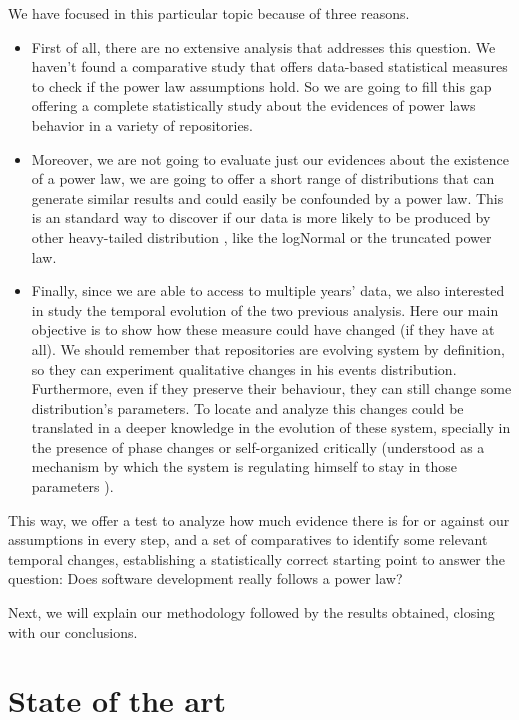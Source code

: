 \documentclass[conference]{IEEEtran}
\begin{document}
We have focused in this particular topic because of three reasons.\begin{itemize} 
\item First of all, there are no 
extensive analysis that addresses this question. We haven't found a comparative study 
that offers data-based statistical measures to check if the power law assumptions hold.
So we are going to fill this gap offering a complete statistically study about
the evidences of power laws behavior in a variety of repositories.
\item Moreover, we are not going to evaluate just our evidences about the existence of a power law,
we are going to offer a short range of distributions that can generate similar results and could
easily be confounded by a power law. This is an standard way to discover if our data is more likely
to be produced by other heavy-tailed distribution \cite{clauset2009power}, like the logNormal
or the truncated power law. 
\item 
Finally, since we are able to access to multiple years' data, we also interested in study the
temporal evolution of the two previous analysis. Here our main objective is to show how these measure could 
have changed (if they have at all). We should remember that repositories are evolving system
by definition, so they can experiment qualitative changes in his events distribution. Furthermore, even 
if they preserve their behaviour, they can still change some distribution's parameters.
To locate and analyze this changes could be translated in a deeper knowledge in the evolution 
of these system, specially in the presence of phase changes \cite{merelo2017self} or self-organized
critically (understood as a mechanism by which the system is regulating himself to stay in those 
parameters \cite{newman2005power}).
\end{itemize}

This way, we offer a test to analyze how much evidence there is for or
against our assumptions in every step, and a set of comparatives to
identify some relevant temporal 
changes, establishing a statistically correct starting point to answer
the question: Does software 
development really follows a power law? 

Next, we will explain our methodology followed by the results obtained,
closing with our conclusions. 



\section{State of the art}\label{soa}
\end{document}
